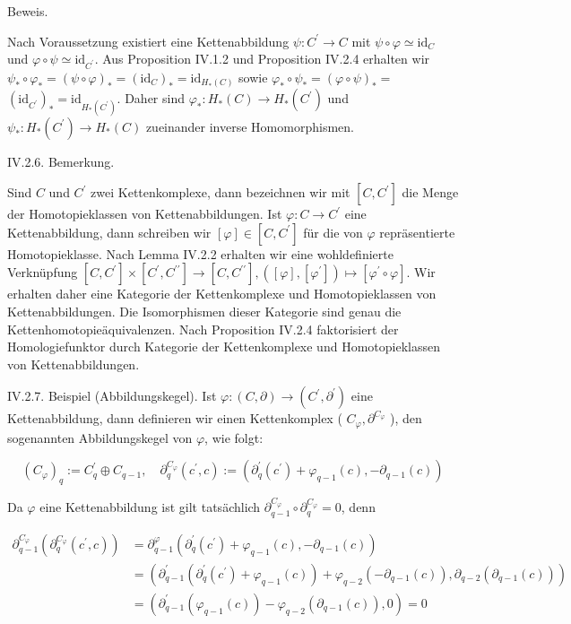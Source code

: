 \documentclass[10pt, letterpaper]{article}
\begin{document}
Beweis. 

Nach Voraussetzung existiert eine Kettenabbildung $\psi: C^{\prime} \rightarrow C$ mit $\psi \circ \varphi \simeq \mathrm{id}_C$ und $\varphi \circ \psi \simeq \mathrm{id}_{C^{\prime}}$. Aus Proposition IV.1.2 und Proposition IV.2.4 erhalten wir $\psi_* \circ \varphi_*=(\psi \circ \varphi)_*=\left(\mathrm{id}_C\right)_*=\mathrm{id}_{H_*(C)}$ sowie $\varphi_* \circ \psi_*=(\varphi \circ \psi)_*=$ $\left(\mathrm{id}_{C^{\prime}}\right)_*=\mathrm{id}_{H_*\left(C^{\prime}\right)}$. Daher sind $\varphi_*: H_*(C) \rightarrow H_*\left(C^{\prime}\right)$ und $\psi_*: H_*\left(C^{\prime}\right) \rightarrow H_*(C)$ zueinander inverse Homomorphismen.


IV.2.6. Bemerkung. 

Sind $C$ und $C^{\prime}$ zwei Kettenkomplexe, dann bezeichnen wir mit $\left[C, C^{\prime}\right]$ die Menge der Homotopieklassen von Kettenabbildungen. Ist $\varphi: C \rightarrow C^{\prime}$ eine Kettenabbildung, dann schreiben wir $[\varphi] \in\left[C, C^{\prime}\right]$ für die von $\varphi$ repräsentierte Homotopieklasse. Nach Lemma IV.2.2 erhalten wir eine wohldefinierte Verknüpfung $\left[C, C^{\prime}\right] \times\left[C^{\prime}, C^{\prime \prime}\right] \rightarrow\left[C, C^{\prime \prime}\right],\left([\varphi],\left[\varphi^{\prime}\right]\right) \mapsto\left[\varphi^{\prime} \circ \varphi\right]$. Wir erhalten daher eine Kategorie der Kettenkomplexe und Homotopieklassen von Kettenabbildungen. Die Isomorphismen dieser Kategorie sind genau die Kettenhomotopieäquivalenzen. Nach Proposition IV.2.4 faktorisiert der Homologiefunktor durch Kategorie der Kettenkomplexe und Homotopieklassen von Kettenabbildungen.

IV.2.7. Beispiel (Abbildungskegel). Ist $\varphi:(C, \partial) \rightarrow\left(C^{\prime}, \partial^{\prime}\right)$ eine Kettenabbildung, dann definieren wir einen Kettenkomplex ( $C_{\varphi}, \partial^{C_{\varphi}}$ ), den sogenannten Abbildungskegel von $\varphi$, wie folgt:

$$
\left(C_{\varphi}\right)_q:=C_q^{\prime} \oplus C_{q-1}, \quad \partial_q^{C_{\varphi}}\left(c^{\prime}, c\right):=\left(\partial_q^{\prime}\left(c^{\prime}\right)+\varphi_{q-1}(c),-\partial_{q-1}(c)\right)
$$


Da $\varphi$ eine Kettenabbildung ist gilt tatsächlich $\partial_{q-1}^{C_{\varphi}} \circ \partial_q^{C_{\varphi}}=0$, denn

$$
\begin{aligned}
\partial_{q-1}^{C_{\varphi}}\left(\partial_q^{C_{\varphi}}\left(c^{\prime}, c\right)\right) & =\partial_{q-1}^{\varphi}\left(\partial_q^{\prime}\left(c^{\prime}\right)+\varphi_{q-1}(c),-\partial_{q-1}(c)\right) \\
& =\left(\partial_{q-1}^{\prime}\left(\partial_q^{\prime}\left(c^{\prime}\right)+\varphi_{q-1}(c)\right)+\varphi_{q-2}\left(-\partial_{q-1}(c)\right), \partial_{q-2}\left(\partial_{q-1}(c)\right)\right) \\
& =\left(\partial_{q-1}^{\prime}\left(\varphi_{q-1}(c)\right)-\varphi_{q-2}\left(\partial_{q-1}(c)\right), 0\right)=0
\end{aligned}
$$
\end{document}
